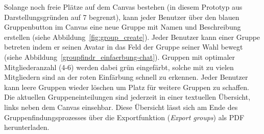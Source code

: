 Solange noch freie Plätze auf dem Canvas bestehen (in diesem Prototyp aus Darstellungsgründen auf 7 begrenzt), kann jeder Benutzer über den blauen Gruppenbutton im Canvas eine neue Gruppe mit Namen und Beschreibung erstellen (siehe Abbildung~\ref{fig:group_create}). Jeder Benutzer kann einer Gruppe betreten indem er seinen Avatar in das Feld der Gruppe seiner Wahl bewegt (siehe Abbildung~\ref{groupfindr_einfaerbung-chat}). Gruppen mit optimaler Mitgliederanzahl (4-6) werden dabei grün eingefärbt, solche mit zu vielen Mitgliedern sind an der roten Einfärbung schnell zu erkennen. Jeder Benutzer kann leere Gruppen wieder löschen um Platz für weitere Gruppen zu schaffen. Die aktuellen Gruppeneinteilungen sind jederzeit in einer textuellen Übersicht, links neben dem Canvas einsehbar. Diese Übersicht lässt sich am Ende des Gruppenfindungsprozesses über die Exportfunktion (\emph{Export groups}) als PDF herunterladen.